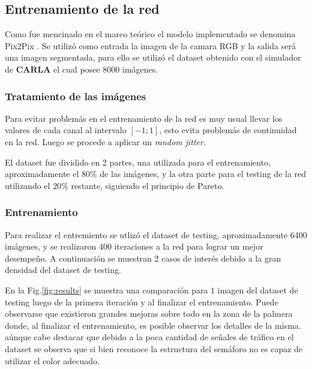 \documentclass[]{IEEEtran}
\begin{document}
    \subsection{Entrenamiento de la red}

    Como fue mencinado en el marco teórico el modelo implementado se denomina Pix2Pix \cite{Pix2Pix}.
    Se utilizó como entrada la imagen de la camara RGB y la salida será una imagen segmentada, para ello se utilizó
    el dataset obtenido con el simulador de \textbf{CARLA} el cual posee 8000 imágenes. 

    \subsubsection{Tratamiento de las imágenes}

    Para evitar problemás en el entrenamiento de la red es muy usual llevar los valores de cada canal al 
    intervalo $[-1;1]$, esto evita problemás de continuidad en la red. Luego 
    se procede a aplicar un \textit{random jitter}.

    El dataset fue dividido en 2 partes, una utilizada para el entrenamiento, aproximadamente el $80 \% $ de las imágenes, y la 
    otra parte para el testing de la red utilizando el $20 \%$ restante, siguiendo el principio de Pareto.

    \subsubsection{Entrenamiento}

    Para realizar el entremiento se utlizó el dataset de testing, aproximadamente 6400 imágenes, 
    y se realizaron 400 iteraciones a la red para lograr un mejor desempeño. A continuación se muestran 2 
    casos de interés debido a la gran densidad del dataset de testing.
    
    En la Fig.\ref{fig:results}
    se muestra una comparación para $1$ imagen del dataset de testing luego de la primera iteración 
    y al finalizar el entrenamiento.
    Puede observarse que existieron grandes mejoras sobre todo en la zona de la palmera
    donde, al finalizar el entrenamiento, es posible observar los detalles de la misma.
    aúnque cabe destacar que debido a la poca cantidad de señales de tráfico en el dataset
    se observa que si bien reconoce la estructura del semáforo no es capaz de utilizar el color 
    adecuado.
\end{document}
